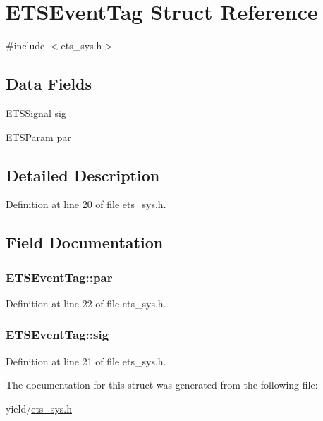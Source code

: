 \hypertarget{structETSEventTag}{\section{E\-T\-S\-Event\-Tag Struct Reference}
\label{structETSEventTag}
}


{\ttfamily \#include $<$ets\-\_\-sys.\-h$>$}

\subsection*{Data Fields}
\begin{DoxyCompactItemize}
\item 
\hyperlink{ets__sys_8h_a5ca6a2be825d5fb421c6e97e8d65d5ca}{E\-T\-S\-Signal} \hyperlink{structETSEventTag_ad1d6c1080c28369b619311d17902b744}{sig}
\item 
\hyperlink{ets__sys_8h_af69975ab315b652862825f9929e436c0}{E\-T\-S\-Param} \hyperlink{structETSEventTag_a6015492ea4e05e188d2a3e293aefeb31}{par}
\end{DoxyCompactItemize}


\subsection{Detailed Description}


Definition at line 20 of file ets\-\_\-sys.\-h.



\subsection{Field Documentation}
\hypertarget{structETSEventTag_a6015492ea4e05e188d2a3e293aefeb31}{
\subsubsection[{par}]{ E\-T\-S\-Event\-Tag\-::par}}\label{structETSEventTag_a6015492ea4e05e188d2a3e293aefeb31}


Definition at line 22 of file ets\-\_\-sys.\-h.

\hypertarget{structETSEventTag_ad1d6c1080c28369b619311d17902b744}{
\subsubsection[{sig}]{ E\-T\-S\-Event\-Tag\-::sig}}\label{structETSEventTag_ad1d6c1080c28369b619311d17902b744}


Definition at line 21 of file ets\-\_\-sys.\-h.



The documentation for this struct was generated from the following file\-:\begin{DoxyCompactItemize}
\item 
yield/\hyperlink{ets__sys_8h}{ets\-\_\-sys.\-h}\end{DoxyCompactItemize}
